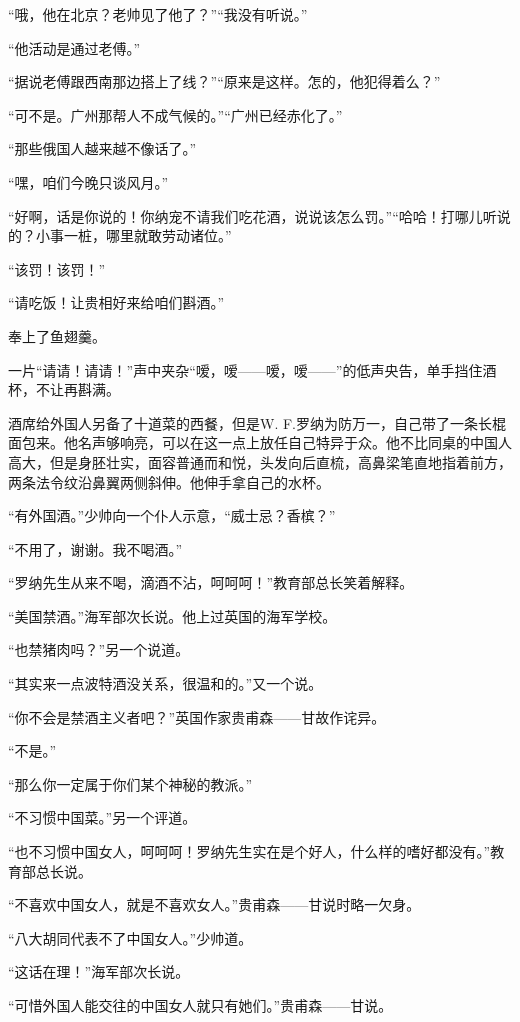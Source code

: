 \par “哦，他在北京？老帅见了他了？”“我没有听说。”
\par “他活动是通过老傅。”
\par “据说老傅跟西南那边搭上了线？”“原来是这样。怎的，他犯得着么？”
\par “可不是。广州那帮人不成气候的。”“广州已经赤化了。”
\par “那些俄国人越来越不像话了。”
\par “嘿，咱们今晚只谈风月。”
\par “好啊，话是你说的！你纳宠不请我们吃花酒，说说该怎么罚。”“哈哈！打哪儿听说的？小事一桩，哪里就敢劳动诸位。”
\par “该罚！该罚！”
\par “请吃饭！让贵相好来给咱们斟酒。”
\par 奉上了鱼翅羹。
\par 一片“请请！请请！”声中夹杂“嗳，嗳——嗳，嗳——”的低声央告，单手挡住酒杯，不让再斟满。
\par 酒席给外国人另备了十道菜的西餐，但是W. F.罗纳为防万一，自己带了一条长棍面包来。他名声够响亮，可以在这一点上放任自己特异于众。他不比同桌的中国人高大，但是身胚壮实，面容普通而和悦，头发向后直梳，高鼻梁笔直地指着前方，两条法令纹沿鼻翼两侧斜伸。他伸手拿自己的水杯。
\par “有外国酒。”少帅向一个仆人示意，“威士忌？香槟？”
\par “不用了，谢谢。我不喝酒。”
\par “罗纳先生从来不喝，滴酒不沾，呵呵呵！”教育部总长笑着解释。
\par “美国禁酒。”海军部次长说。他上过英国的海军学校。
\par “也禁猪肉吗？”另一个说道。
\par “其实来一点波特酒没关系，很温和的。”又一个说。
\par “你不会是禁酒主义者吧？”英国作家贵甫森——甘故作诧异。
\par “不是。”
\par “那么你一定属于你们某个神秘的教派。”
\par “不习惯中国菜。”另一个评道。
\par “也不习惯中国女人，呵呵呵！罗纳先生实在是个好人，什么样的嗜好都没有。”教育部总长说。
\par “不喜欢中国女人，就是不喜欢女人。”贵甫森——甘说时略一欠身。
\par “八大胡同代表不了中国女人。”少帅道。
\par “这话在理！”海军部次长说。
\par “可惜外国人能交往的中国女人就只有她们。”贵甫森——甘说。
